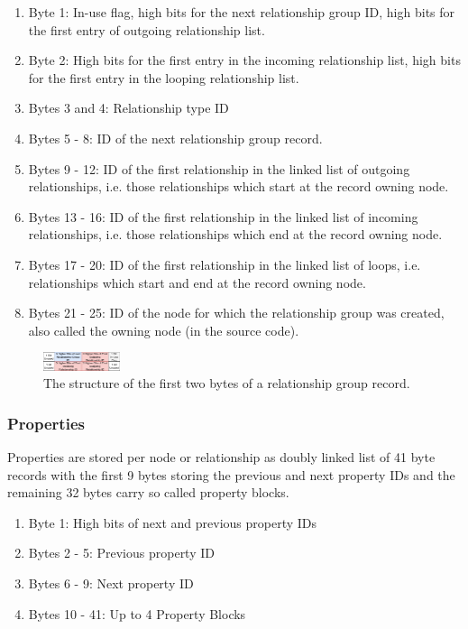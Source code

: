 \documentclass[a4paper,10pt]{article}
\begin{document}
            \begin{enumerate}
                \item Byte 1: In-use flag, high bits for the next relationship group ID, high bits for the first entry of outgoing relationship list.
                \item Byte 2: High bits for the first entry in the incoming relationship list, high bits for the first entry in the looping relationship list.
                \item Bytes 3 and 4: Relationship type ID
                \item Bytes 5 - 8: ID of the next relationship group record.
                \item Bytes 9 - 12: ID of the first relationship in the linked list of outgoing relationships, i.e. those relationships which start at the record owning node.
                \item Bytes 13 - 16: ID of the first relationship in the linked list of incoming relationships, i.e. those relationships which end at the record owning node.
                \item Bytes 17 - 20: ID of the first relationship in the linked list of loops, i.e. relationships which start and end at the record owning node.
                \item Bytes 21 - 25: ID of the node for which the relationship group was created, also called the owning node (in the source code).
            \end{enumerate}
            
            \begin{figure}[htp]\label{rel_group_first_bytes}
                \begin{center}
                    \includegraphics[keepaspectratio,height=0.2\textheight,width=0.2\textwidth]{img/03_record/relationship/relationship_group_first_bytes.png}
                \end{center}
                \caption{The structure of the first two bytes of a relationship group record.} %
            \end{figure}
        

        \subsubsection{Properties}
            Properties are stored per node or relationship as doubly linked list of 41 byte records with the first 9 bytes storing the previous and next property IDs and the remaining 32 bytes carry so called property blocks.
            \begin{enumerate}
            \item Byte 1: High bits of next and previous property IDs
            \item Bytes 2 - 5: Previous property ID
            \item Bytes 6 - 9: Next property ID
            \item Bytes 10 - 41: Up to 4 Property Blocks
            \end{enumerate}
            
\end{document}
